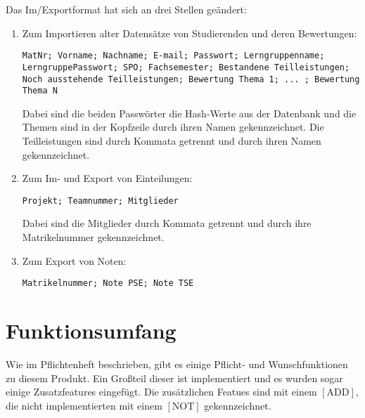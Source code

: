 \documentclass[parskip=full]{scrartcl}
\begin{document}
Das Im/Exportformat hat sich an drei Stellen geändert: 
\begin{enumerate}
  \item Zum Importieren alter Datensätze von Studierenden und deren Bewertungen:
 \\ \begin{tcolorbox}[enhanced jigsaw, %
 colback=testgrauRGB, %
 coltext=black, %
 sharp corners, %
 colframe=black, %
 boxrule=0pt %
 ]
 \texttt{MatNr; Vorname; Nachname; E-mail; Passwort; Lerngruppenname;
 LerngruppePasswort; SPO; Fachsemester; Bestandene Teilleistungen; Noch
 ausstehende Teilleistungen; Bewertung Thema 1; ... ; Bewertung Thema N}
  \end{tcolorbox}
  Dabei sind die beiden Passwörter die Hash-Werte aus der Datenbank und die
  Themen sind in der Kopfzeile durch ihren Namen gekennzeichnet. Die
  Teilleistungen sind durch Kommata getrennt und durch ihren Namen
  gekennzeichnet. 
  \item Zum Im- und Export von Einteilungen: \\ \begin{tcolorbox}[enhanced
  jigsaw,
 colback=testgrauRGB, %
 coltext=black, %
 sharp corners, %
 colframe=black, %
 boxrule=0pt %
 ]
 \texttt{Projekt; Teamnummer; Mitglieder}
  \end{tcolorbox}
  Dabei sind die Mitglieder durch Kommata getrennt und durch ihre Matrikelnummer
  gekennzeichnet.
  \item Zum Export von Noten: \\ \begin{tcolorbox}[enhanced
  jigsaw,
 colback=testgrauRGB, %
 coltext=black, %
 sharp corners, %
 colframe=black, %
 boxrule=0pt %
 ]
 \texttt{Matrikelnummer; Note PSE; Note TSE}
  \end{tcolorbox}
\end{enumerate}
\section{Funktionsumfang }
Wie im Pflichtenheft beschrieben, gibt es einige Pflicht- und Wunschfunktionen
zu diesem Produkt. Ein Großteil dieser ist implementiert und es wurden sogar
einige Zusatzfeatures eingefügt. Die zusätzlichen Featues sind mit einem
$[\text{ADD}]$, die nicht implementierten mit einem $[\text{NOT}]$
gekennzeichnet.
\end{document}
